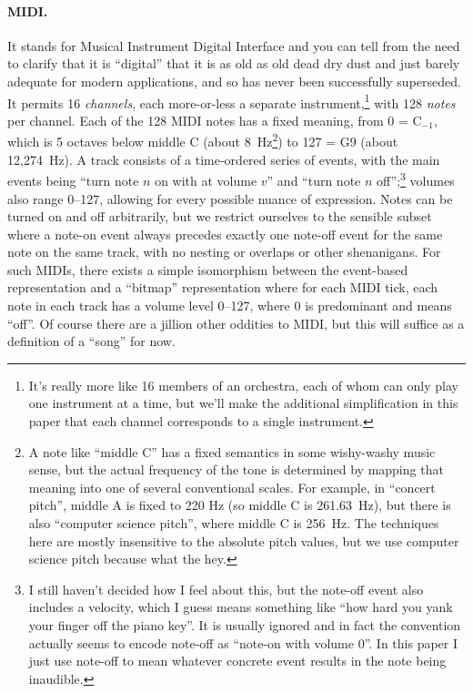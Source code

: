 \documentclass[twocolumn]{article}
\begin{document}
\paragraph{MIDI.} It stands for Musical Instrument Digital Interface
and you can tell from the need to clarify that it is ``digital'' that
it is as old as old dead dry dust and just barely adequate for modern
applications, and so has never been successfully superseded. It
permits 16 {\it channels}, each more-or-less a separate
instrument,\!\footnote{It's really more like 16 members of an
  orchestra, each of whom can only play one instrument at a time, but
  we'll make the additional simplification in this paper that each
  channel corresponds to a single instrument.} with 128 {\it notes}
per channel. Each of the 128 MIDI notes has a fixed meaning, from 0 =
C$_{-1}$, which is 5 octaves below middle C (about 8~Hz\footnote{A
  note like ``middle C'' has a fixed semantics in some wishy-washy
  music sense, but the actual frequency of the tone is determined by
  mapping that meaning into one of several conventional scales. For
  example, in ``concert pitch'', middle A is fixed to 220 Hz (so
  middle C is 261.63~Hz), but there is also ``computer science
  pitch'', where middle C is 256~Hz. The techniques here are mostly
  insensitive to the absolute pitch values, but we use computer
  science pitch because what the hey. }) to 127 = G9 (about
12,274~Hz). A track consists of a time-ordered series of events, with
the main events being ``turn note $n$ on with at volume $v$'' and
``turn note $n$ off'';\footnote{I still haven't decided how I feel
  about this, but the note-off event also includes a velocity, which I
  guess means something like ``how hard you yank your finger off the
  piano key''. It is usually ignored and in fact the convention
  actually seems to encode note-off as ``note-on with volume 0''. In
  this paper I just use note-off to mean whatever concrete event
  results in the note being inaudible.} volumes also range 0--127,
allowing for every possible nuance of expression. Notes can be turned
on and off arbitrarily, but we restrict ourselves to the sensible
subset where a note-on event always precedes exactly one note-off
event for the same note on the same track, with no nesting or overlaps
or other shenanigans. For such MIDIs, there exists a simple
isomorphism between the event-based representation and a ``bitmap''
representation where for each MIDI tick, each note in each track has a
volume level 0--127, where 0 is predominant and means ``off''. Of
course there are a jillion other oddities to MIDI, but this will
suffice as a definition of a ``song'' for now.
\end{document}
